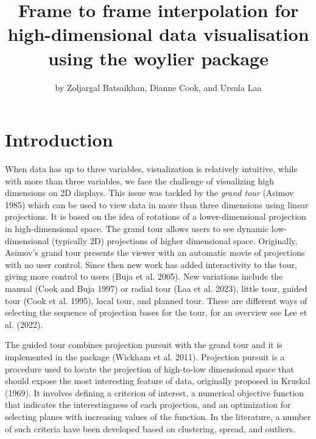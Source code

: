 \title{Frame to frame interpolation for high-dimensional data visualisation using the woylier package}


\author{by Zoljargal Batsaikhan, Dianne Cook, and Ursula Laa}

\maketitle


\hypertarget{introduction}{%
\section{Introduction}\label{introduction}}

When data has up to three variables, visualization is relatively intuitive, while with more than three variables, we face the challenge of visualizing high dimensions on 2D displays. This issue was tackled by the \emph{grand tour} (Asimov 1985) which can be used to view data in more than three dimensions using linear projections. It is based on the idea of rotations of a lower-dimensional projection in high-dimensional space. The grand tour allows users to see dynamic low-dimensional (typically 2D) projections of higher dimensional space. Originally, Asimov's grand tour presents the viewer with an automatic movie of projections with no user control. Since then new work has added interactivity to the tour, giving more control to users (Buja et al. 2005). New variations include the manual (Cook and Buja 1997) or radial tour (Laa et al. 2023), little tour, guided tour (Cook et al. 1995), local tour, and planned tour. These are different ways of selecting the sequence of projection bases for the tour, for an overview see Lee et al. (2022).

The guided tour combines projection pursuit with the grand tour and it is implemented in the  package (Wickham et al. 2011). Projection pursuit is a procedure used to locate the projection of high-to-low dimensional space that should expose the most interesting feature of data, originally proposed in Kruskal (1969). It involves defining a criterion of interest, a numerical objective function that indicates the interestingness of each projection, and an optimization for selecting planes with increasing values of the function. In the literature, a number of such criteria have been developed based on clustering, spread, and outliers.

